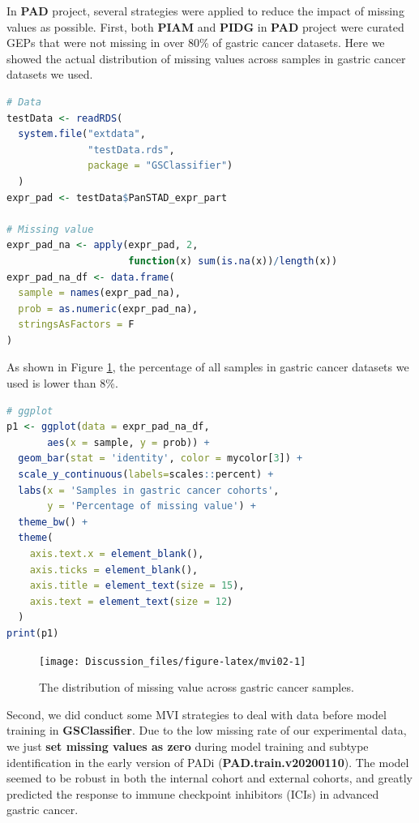 \documentclass[
  12pt,
]{book}
\begin{document}
In \textbf{PAD} project, several strategies were applied to reduce the impact of missing values as possible. First, both \textbf{PIAM} and \textbf{PIDG} in \textbf{PAD} project were curated GEPs that were not missing in over 80\% of gastric cancer datasets. Here we showed the actual distribution of missing values across samples in gastric cancer datasets we used.

\begin{lstlisting}[language=R]
# Data
testData <- readRDS(
  system.file("extdata", 
              "testData.rds", 
              package = "GSClassifier")
  )
expr_pad <- testData$PanSTAD_expr_part

# Missing value
expr_pad_na <- apply(expr_pad, 2, 
                     function(x) sum(is.na(x))/length(x))
expr_pad_na_df <- data.frame(
  sample = names(expr_pad_na),
  prob = as.numeric(expr_pad_na),
  stringsAsFactors = F
)
\end{lstlisting}

As shown in Figure \ref{fig:mvi02}, the percentage of all samples in gastric cancer datasets we used is lower than 8\%.

\begin{lstlisting}[language=R]
# ggplot
p1 <- ggplot(data = expr_pad_na_df, 
       aes(x = sample, y = prob)) + 
  geom_bar(stat = 'identity', color = mycolor[3]) + 
  scale_y_continuous(labels=scales::percent) + 
  labs(x = 'Samples in gastric cancer cohorts', 
       y = 'Percentage of missing value') + 
  theme_bw() +
  theme(
    axis.text.x = element_blank(),
    axis.ticks = element_blank(),
    axis.title = element_text(size = 15),
    axis.text = element_text(size = 12)
  )
print(p1)
\end{lstlisting}

\begin{figure}

{\centering \texttt{[image: Discussion\_files/figure-latex/mvi02-1]} 

}

\caption{The distribution of missing value across gastric cancer samples.}\label{fig:mvi02}
\end{figure}

Second, we did conduct some MVI strategies to deal with data before model training in \textbf{GSClassifier}. Due to the low missing rate of our experimental data, we just \textbf{set missing values as zero} during model training and subtype identification in the early version of PADi (\textbf{PAD.train.v20200110}). The model seemed to be robust in both the internal cohort and external cohorts, and greatly predicted the response to immune checkpoint inhibitors (ICIs) in advanced gastric cancer.
\end{document}
